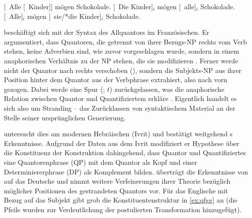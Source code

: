 \begin{exe}
\ex \label{ex:floatsubj}
\begin{xlist}
	\ex \label{ex:floatsubj_1}
		[~Alle [~Kinder]] mögen Schokolade.
	\ex \label{ex:floatsubj_2}
		[~Die Kinder]$_i$ mögen [~alle]$_i$ Schokolade.
	\ex \label{ex:floatsubj_3}
		[~Alle]$_i$ mögen [~sie/*die Kinder]$_i$
			Schokolade.
\end{xlist}

\end{exe}

\citet{sportiche1988} beschäftigt sich mit der Syntax des Allquantors 
 im Französischen. Er argumentiert, dass Quantoren, die getrennt von
ihrer Bezugs-NP rechts vom Verb stehen, keine Adverbien sind, wie zuvor
vorgeschlagen wurde, sondern in einem anaphorischen Verhältnis zu der NP
stehen, die sie modifizieren \autocite[428--433]{sportiche1988}. Ferner werde
nicht der Quantor nach rechts verschoben (), sondern die
Subjekts-NP aus ihrer Position hinter dem Quantor aus der Verbphrase
extrahiert, also nach vorn gezogen. Dabei werde eine Spur (; $t$)
zurückgelassen, was die anaphorische Relation zwischen Quantor und
Quantifiziertem erkläre \autocite[432--433]{sportiche1988}. Eigentlich handelt
es sich also um Stranding -- das Zurücklassen von syntaktischem Material an der
Stelle seiner ursprünglichen Generierung.

\citet{shlonsky1991} untersucht dies am modernen Hebräischen (Ivrit) und
bestätigt weitgehend \citeauthor{sportiche1988}s Erkenntnisse. Aufgrund der
Daten aus dem Ivrit modifiziert er  Hypothese über die
Konstituenz der Konstruktion dahingehend, dass Quantor und Quantifiziertes eine
Quantorenphrase (QP) mit dem Quantor als Kopf und einer Determiniererphrase
(DP) als Komplement bilden. \citet{merchant1996} überträgt die Erkenntnisse von
\citet{sportiche1988,shlonsky1991} auf das Deutsche und nimmt weitere
Verfeinerungen ihrer Theorie bezüglich möglicher Positionen des gestrandeten
Quantors vor. Für das Englische   mit Bezug auf das Subjekt
gibt \citet[180]{merchant1996} grob die Konstituentenstruktur in \cref{ex:qfgg}
an (die Pfeile wurden zur Verdeutlichung der postulierten Transformation
hinzugefügt).

